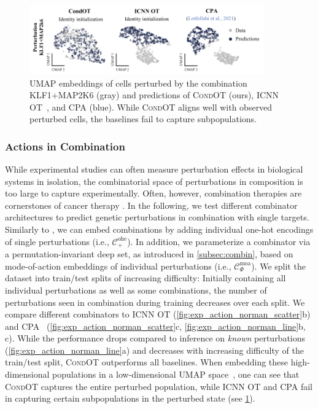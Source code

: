  \begin{figure}
    \centering
    \includegraphics[width=0.9\textwidth]{figures/fig_action_comb_comparison_umap.pdf}
    \caption{ \acrshort{UMAP} embeddings of cells perturbed by the combination KLF1+MAP2K6 (gray) and predictions of \textsc{CondOT} (ours), \textsc{ICNN OT}~\citep{makkuva2020optimal}, and \textsc{CPA} (blue). While \textsc{CondOT} aligns well with observed perturbed cells, the baselines fail to capture subpopulations.}
    \label{fig:action_comb_comparison_umap}
\end{figure}
 

\subsubsection{Actions in Combination}
\label{sec:eval_action_comb}

 While experimental studies can often measure perturbation effects in biological systems in isolation, the combinatorial space of perturbations in composition is too large to capture experimentally. Often, however, combination therapies are cornerstones of cancer therapy \citep{mokhtari2017combination}.
In the following, we test different combinator architectures to predict genetic perturbations in combination with single targets.
Similarly to \citet{lotfollahi2021compositional}, we can embed combinations by adding individual one-hot encodings of single perturbations (i.e., $\mathcal{C}^\text{ohe}_+$). In addition, we parameterize a combinator via a permutation-invariant deep set, as introduced in \cref{subsec:combin}, based on mode-of-action embeddings of individual perturbations (i.e., $\mathcal{C}^\text{moa}_\Phi$). 
We split the dataset into train/test splits of increasing difficulty: Initially containing all individual perturbations as well as some combinations, the number of perturbations seen in combination during training decreases over each split.
We compare different combinators to \textsc{ICNN OT} (\cref{fig:exp_action_norman_scatter}b) and \textsc{CPA}~\citep{lotfollahi2021compositional} (\cref{fig:exp_action_norman_scatter}c, \cref{fig:exp_action_norman_line}b, c). While the performance drops compared to inference on \emph{known} perturbations (\cref{fig:exp_action_norman_line}a) and decreases with increasing difficulty of the train/test split, \textsc{CondOT} outperforms all baselines.
When embedding these high-dimensional populations in a low-dimensional \acrshort{UMAP} space~\citep{umap}, one can see that \textsc{CondOT} captures the entire perturbed population, while \textsc{ICNN OT} and \textsc{CPA} fail in capturing certain subpopulations in the perturbed state (see \cref{fig:action_comb_comparison_umap}).


